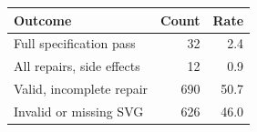 \begin{tabular}{lrr}
\toprule
Outcome & Count & Rate \\
\midrule
Full specification pass & 32 & 2.4 \\
All repairs, side effects & 12 & 0.9 \\
Valid, incomplete repair & 690 & 50.7 \\
Invalid or missing SVG & 626 & 46.0 \\
\bottomrule
\end{tabular}
